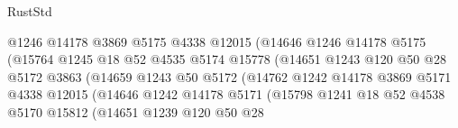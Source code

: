 \begin{lexlean}{RustStd}
\begin{coremodule}
                                      @1246
                                      @14178
                                      @3869
                                      @5175
                                      @4338
                                      @12015
                                      (@14646
                                        @1246
                                        @14178
                                        @5175
                                        (@15764
                                          @1245
                                          @18
                                          @52
                                          @4535
                                          @5174
                                          @15778
                                          (@14651
                                            @1243
                                            @120
                                            @50
                                            @28
                                            @5172
                                            @3863
                                            (@14659
                                              @1243
                                              @50
                                              @5172
                                              (@14762
                                                @1242
                                                @14178
                                                @3869
                                                @5171
                                                @4338
                                                @12015
                                                (@14646
                                                  @1242
                                                  @14178
                                                  @5171
                                                  (@15798
                                                    @1241
                                                    @18
                                                    @52
                                                    @4538
                                                    @5170
                                                    @15812
                                                    (@14651
                                                      @1239
                                                      @120
                                                      @50
                                                      @28

\end{coremodule}
\end{lexlean}
